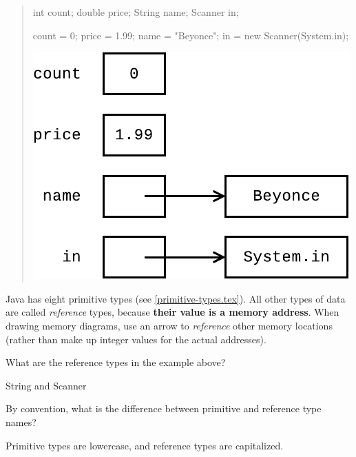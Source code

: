 
\begin{quote}
\begin{multicols}{2}

\begin{javalst}
int count;
double price;
String name;
Scanner in;

count = 0;
price = 1.99;
name = "Beyonce";
in = new Scanner(System.in);
\end{javalst}

\includegraphics[width=\linewidth]{reference1.pdf}

\end{multicols}
\end{quote}

Java has eight primitive types (see \ref{primitive-types.tex}).
All other types of data are called \emph{reference} types, because \textbf{their value is a memory address}.
When drawing memory diagrams, use an arrow to \emph{reference} other memory locations (rather than make up integer values for the actual addresses).




\Q What are the reference types in the example above?

\begin{answer}
String and Scanner
\end{answer}


\Q By convention, what is the difference between primitive and reference type names?

\begin{answer}
Primitive types are lowercase, and reference types are capitalized.
\end{answer}


